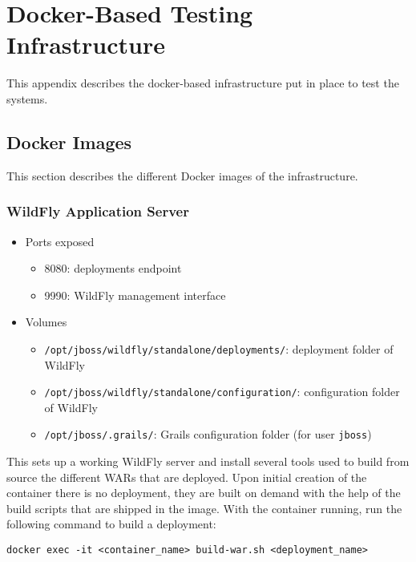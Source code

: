 \chapter{Docker-Based Testing Infrastructure}

This appendix describes the docker-based infrastructure put in place to test the systems.

\section{Docker Images}
\label{sec:docker-images}

This section describes the different Docker images of the infrastructure.

\subsection{WildFly Application Server}

\begin{itemize}
    \item Ports exposed
        \begin{itemize}
        \item 8080: deployments endpoint
        \item 9990: WildFly management interface
        \end{itemize}
        
    \item Volumes
        \begin{itemize}
        \item \verb|/opt/jboss/wildfly/standalone/deployments/|: deployment folder of WildFly
        \item \verb|/opt/jboss/wildfly/standalone/configuration/|: configuration folder of WildFly
        \item \verb|/opt/jboss/.grails/|: Grails configuration folder (for user \verb|jboss|)
        \end{itemize}
\end{itemize}

This sets up a working WildFly server and install several tools used to build from source the different WARs that are deployed.
Upon initial creation of the container there is no deployment, they are built on demand with the help of the build scripts that are shipped in the image.
With the container running, run the following command to build a deployment: 

\begin{verbatim}
docker exec -it <container_name> build-war.sh <deployment_name>
\end{verbatim}

